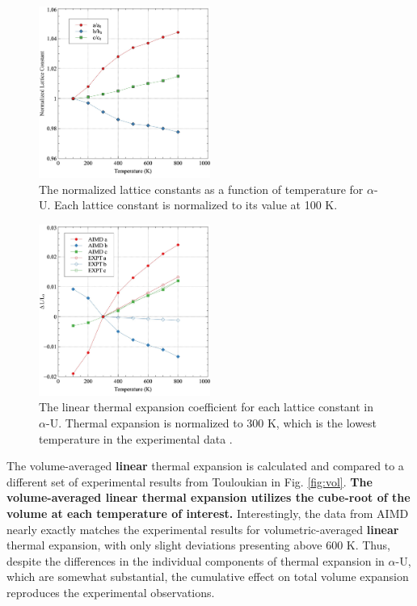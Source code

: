 \documentclass[utf8]{frontiersSCNS} %
\providecommand{\DIFaddtex}[1]{{\bf #1}} %
\providecommand{\DIFaddbegin}{\protect\color{blue}} %
\providecommand{\DIFaddend}{\protect\color{black}} %
\providecommand{\DIFadd}[1]{\texorpdfstring{\DIFaddtex{#1}}{#1}} %
\begin{document}
 \begin{figure}[hbt]
	\centering
	\includegraphics[width=0.5\textwidth]{a0_norm.jpg}
  \caption{The normalized lattice constants as a function of temperature for $\alpha$-U. Each lattice constant is normalized to its value at 100 K.}\label{fig:a0}
\end{figure}

 \begin{figure}[hbt]
	\centering
	\includegraphics[width=0.5\textwidth]{lte.jpg}
  \caption{The linear thermal expansion coefficient for each lattice constant in $\alpha$-U. Thermal expansion is normalized to 300 K, which is the lowest temperature in the experimental data \cite{touloukian}. }\label{fig:exp}
\end{figure}

\FloatBarrier

The volume-averaged \DIFaddbegin \DIFadd{linear }\DIFaddend thermal expansion is calculated and compared to a different set of experimental results from Touloukian \cite{touloukian} in Fig. \ref{fig:vol}. \DIFaddbegin \DIFadd{The volume-averaged linear thermal expansion utilizes the cube-root of the volume at each temperature of interest. }\DIFaddend Interestingly, the data from AIMD nearly exactly matches the experimental results for volumetric-averaged \DIFaddbegin \DIFadd{linear }\DIFaddend thermal expansion, with only slight deviations presenting above 600 K. Thus, despite the differences in the individual components of thermal expansion in $\alpha$-U, which are somewhat substantial, the cumulative effect on total volume expansion reproduces the experimental observations. 
\end{document}
